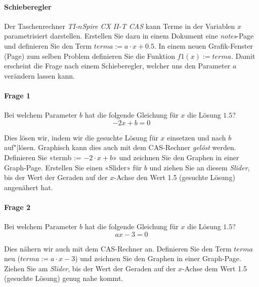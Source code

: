 
\paragraph{Schieberegler} Der Taschenrechner \textit{TI-$n$Spire CX
  II-T CAS} kann Terme in der Variablen $x$ parametrisiert
darstellen. Erstellen Sie dazu in einem Dokument eine
\textit{notes}-Page und definieren Sie den Term $terma := a\cdot
x+0.5$. In einem neuen Grafik-Fenster (Page) zum selben Problem
definieren Sie die Funktion $f1(x):=terma$. Damit erscheint die Frage
nach einem Schieberegler, welcher uns den Parameter $a$ verändern
lassen kann.



\paragraph{Frage 1} Bei welchem Parameter $b$ hat die folgende Gleichung für $x$ die Lösung $1.5$?
$$-2x + b = 0$$

Dies lösen wir, indem wir die gesuchte Lösung für $x$ einsetzen und nach $b$ auf"|lösen. Graphisch kann dies auch mit dem CAS-Rechner \textit{gelöst} werden. Definieren Sie «termb := $-2\cdot{}x+b$» und zeichnen Sie den Graphen in einer Graph-Page.
Erstellen Sie einen «Slider» für $b$ und ziehen Sie an
diesem \textit{Slider}, bis der Wert der Geraden auf der $x$-Achse den
Wert 1.5 (gesuchte Lösung) angenähert hat.


\paragraph{Frage 2} Bei welchem Parameter $b$ hat die folgende Gleichung für $x$ die Lösung $1.5$?
$$ax-3=0$$

Dies nähern wir auch mit dem CAS-Rechner an. Definieren Sie den Term
$terma$ neu ($terma := a\cdot{}x-3$) und zeichnen Sie den Graphen in einer Graph-Page.
Ziehen Sie am \textit{Slider}, bis der Wert der Geraden auf der
$x$-Achse dem Wert 1.5 (gesuchte Lösung) genug nahe kommt.
